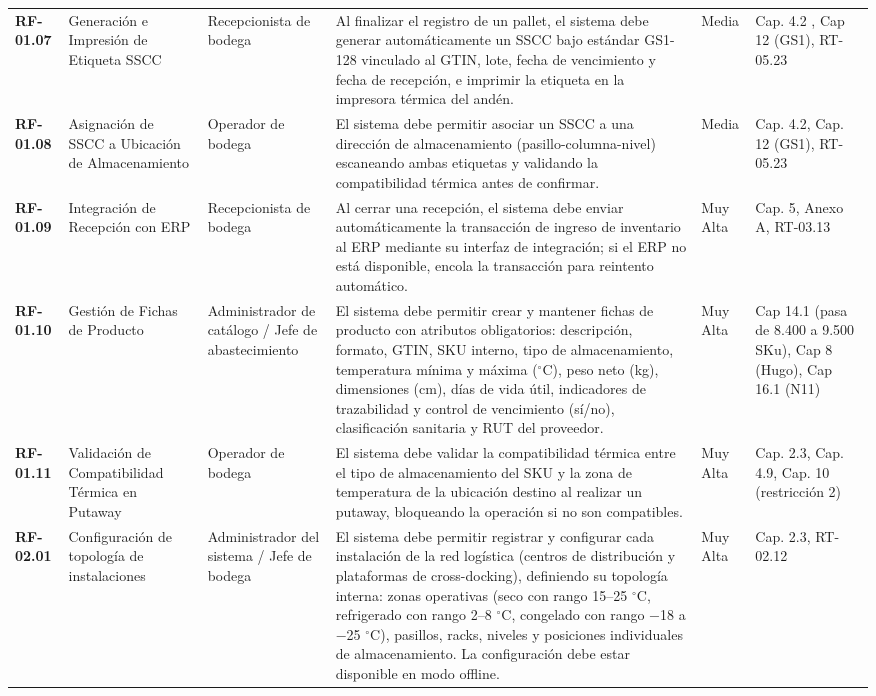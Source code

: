 \begin{longtable}{p{1.7cm} p{2.3cm} p{1.9cm} p{5.0cm} p{1.1cm} p{1.9cm}}
\textbf{RF-01.07} & Generación e Impresión de Etiqueta SSCC & Recepcionista de bodega & Al finalizar el registro de un pallet, el sistema debe generar automáticamente un SSCC bajo estándar GS1-128 vinculado al GTIN, lote, fecha de vencimiento y fecha de recepción, e imprimir la etiqueta en la impresora térmica del andén. & Media & Cap. 4.2 , Cap 12 (GS1), RT-05.23 \\
\textbf{RF-01.08} & Asignación de SSCC a Ubicación de Almacenamiento & Operador de bodega & El sistema debe permitir asociar un SSCC a una dirección de almacenamiento (pasillo-columna-nivel) escaneando ambas etiquetas y validando la compatibilidad térmica antes de confirmar. & Media & Cap. 4.2, Cap. 12 (GS1), RT-05.23 \\
\textbf{RF-01.09} & Integración de Recepción con ERP & Recepcionista de bodega & Al cerrar una recepción, el sistema debe enviar automáticamente la transacción de ingreso de inventario al ERP mediante su interfaz de integración; si el ERP no está disponible, encola la transacción para reintento automático. & Muy Alta & Cap. 5, Anexo A, RT-03.13 \\
\textbf{RF-01.10} & Gestión de Fichas de Producto & Administrador de catálogo / Jefe de abastecimiento & El sistema debe permitir crear y mantener fichas de producto con atributos obligatorios: descripción, formato, GTIN, SKU interno, tipo de almacenamiento, temperatura mínima y máxima (\ensuremath{^\circ}C), peso neto (kg), dimensiones (cm), días de vida útil, indicadores de trazabilidad y control de vencimiento (sí/no), clasificación sanitaria y RUT del proveedor. & Muy Alta & Cap 14.1 (pasa de 8.400 a 9.500 SKu), Cap 8 (Hugo), Cap 16.1 (N11) \\
\textbf{RF-01.11} & Validación de Compatibilidad Térmica en Putaway & Operador de bodega & El sistema debe validar la compatibilidad térmica entre el tipo de almacenamiento del SKU y la zona de temperatura de la ubicación destino al realizar un putaway, bloqueando la operación si no son compatibles. & Muy Alta & Cap. 2.3, Cap. 4.9, Cap. 10 (restricción 2) \\
\textbf{RF-02.01} & Configuración de topología de instalaciones & Administrador del sistema / Jefe de bodega & El sistema debe permitir registrar y configurar cada instalación de la red logística (centros de distribución y plataformas de cross-docking), definiendo su topología interna: zonas operativas (seco con rango 15–25 \ensuremath{^\circ}C, refrigerado con rango 2–8 \ensuremath{^\circ}C, congelado con rango $-$18 a $-$25 \ensuremath{^\circ}C), pasillos, racks, niveles y posiciones individuales de almacenamiento. La configuración debe estar disponible en modo offline. & Muy Alta & Cap. 2.3, RT-02.12 \\

\end{longtable}
